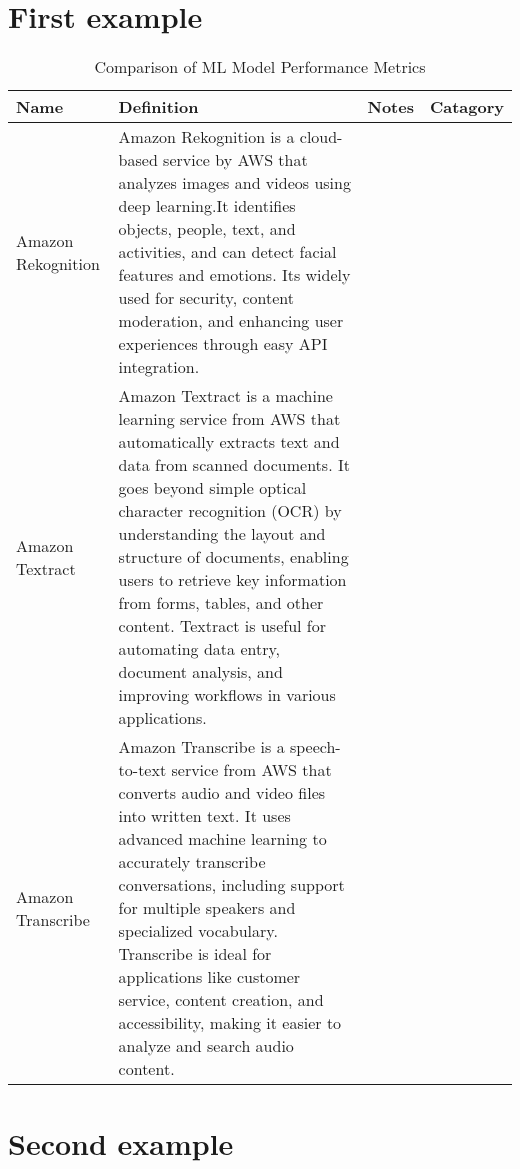 \documentclass{article}
\begin{document}
	\section{First example}
	\begin{table}[htbp]
		\caption{Comparison of ML Model Performance Metrics}
		\label{tab:model_comparison}
		\begin{tabulary}{0.9\linewidth}{LLLL}
			\toprule
			Name & Definition & Notes & Catagory \\
			\midrule
			Amazon Rekognition & Amazon Rekognition is a cloud-based service by AWS that analyzes images and videos using deep learning.It identifies objects, people, text, and activities, and can detect facial features and emotions. Its widely used for security, content moderation, and enhancing user experiences through easy API integration. &  &  \\
			\midrule
			Amazon Textract & Amazon Textract is a machine learning service from AWS that automatically extracts text and data from scanned documents. It goes beyond simple optical character recognition (OCR) by understanding the layout and structure of documents, enabling users to retrieve key information from forms, tables, and other content. Textract is useful for automating data entry, document analysis, and improving workflows in various applications. &  &  \\
			\midrule
			Amazon Transcribe & Amazon Transcribe is a speech-to-text service from AWS that converts audio and video files into written text. It uses advanced machine learning to accurately transcribe conversations, including support for multiple speakers and specialized vocabulary. Transcribe is ideal for applications like customer service, content creation, and accessibility, making it easier to analyze and search audio content. &  &  \\
			\bottomrule
		\end{tabulary}
	\end{table}


	\section{Second example}
\end{document}
